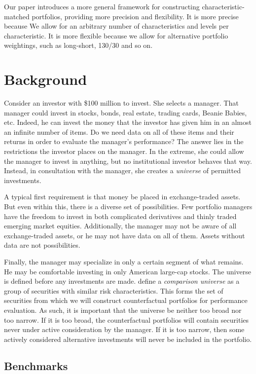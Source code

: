\documentclass{article}\usepackage{graphicx, color}
\begin{document}
Our paper introduces a more general framework for constructing
characteristic-matched portfolios, providing more
precision and flexibility. It is more precise because We allow for an
arbitrary number of characteristics and levels per characteristic. It
is more flexible because we allow for alternative portfolio 
weightings, such as long-short, 130/30 and so on.

\section{Background}

Consider an investor with \$100 million to invest. She selects a manager.
That manager could invest in stocks, bonds, real estate, trading
cards, Beanie Babies, etc. Indeed, he can invest the money that the
investor has given him in an almost an infinite number of items. Do we
need data on all of these items and their returns in order to evaluate
the manager's performance? The answer lies in the restrictions the
investor places on the manager. In the extreme, she could allow the
manager to invest in anything, but no institutional investor behaves
that way. Instead, in consultation with the manager, she creates a
\emph{universe} of permitted investments.

A typical first requirement is that money be placed in exchange-traded
assets. But even within this, there is a diverse set of
possibilities. Few portfolio managers have the freedom to invest in
both complicated derivatives and thinly traded emerging market
equities. Additionally, the manager may not be aware of all
exchange-traded assets, or he may not have data on all of them. Assets
without data are not possibilities.

Finally, the manager may specialize in only a certain segment of what
remains. He may be comfortable investing in only American large-cap
stocks. The universe is defined before any investments are
made. \cite{bodie01.universe} define a \emph{comparison universe} as a
group of securities with similar risk characteristics. This forms the
set of securities from which we will construct counterfactual
portfolios for performance evaluation. As such, it is important that
the universe be neither too broad nor too narrow. If it is too broad,
the counterfactual portfolios will contain securities never under
active consideration by the manager. If it is too narrow, then some
actively considered alternative investments will never be included in
the portfolio.

\subsection{Benchmarks \label{SectionBenchmarks}}
\end{document}
